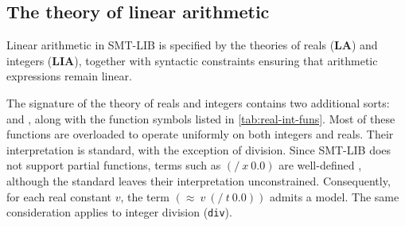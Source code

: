 \subsection{The theory of linear arithmetic}

Linear arithmetic in SMT-LIB is specified by the theories of reals (\textbf{LA}) and integers (\textbf{LIA}), together with syntactic constraints ensuring that arithmetic expressions remain linear.

The signature of the theory of reals and integers contains two additional sorts:  and  , along with the function symbols listed in \cref{tab:real-int-funs}.
Most of these functions are overloaded to operate uniformly on both integers and reals.
Their interpretation is standard, with the exception of division. 
Since SMT-LIB does not support partial functions, terms such as \((/~x~0.0)\) are well-defined , although the standard leaves their interpretation unconstrained.
Consequently, for each real constant \(v\), the term \((\approx~v~(/~t~0.0))\) admits a model.
The same consideration applies to integer division (\texttt{div}).

